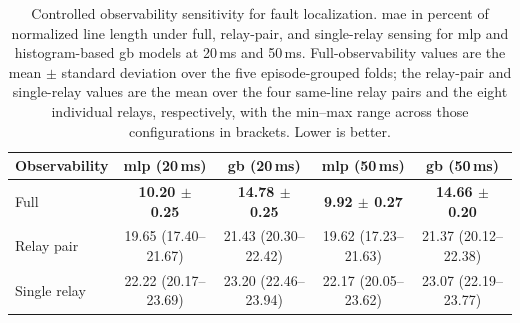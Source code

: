 \begin{table}[pos=t]
\caption{Controlled observability sensitivity for fault localization. \ac{mae} in percent of normalized line length under full, relay-pair, and single-relay sensing for \ac{mlp} and histogram-based \ac{gb} models at 20\,ms and 50\,ms. Full-observability values are the mean $\pm$ standard deviation over the five episode-grouped folds; the relay-pair and single-relay values are the mean over the four same-line relay pairs and the eight individual relays, respectively, with the min--max range across those configurations in brackets. Lower is better.}
\small
\label{tab:fl_observability}
\centering
\begin{tabular}{lcccc}
\toprule
\bfseries Observability & \bfseries \ac{mlp} (20\,ms) & \bfseries \ac{gb} (20\,ms) & \bfseries \ac{mlp} (50\,ms) & \bfseries \ac{gb} (50\,ms) \\
\midrule
Full         & \textbf{10.20 $\pm$ 0.25} & \textbf{14.78 $\pm$ 0.25} & \textbf{9.92 $\pm$ 0.27} & \textbf{14.66 $\pm$ 0.20} \\
Relay pair   & 19.65 (17.40--21.67) & 21.43 (20.30--22.42) & 19.62 (17.23--21.63) & 21.37 (20.12--22.38) \\
Single relay & 22.22 (20.17--23.69) & 23.20 (22.46--23.94) & 22.17 (20.05--23.62) & 23.07 (22.19--23.77) \\
\bottomrule
\end{tabular}
\end{table}

